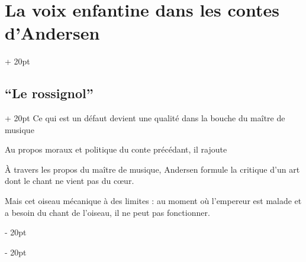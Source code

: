 \documentclass[a4paper, 12pt, twoside]{article}
\newcommand{\ind}[1][20pt]{\advance\leftskip + #1}
\newcommand{\deind}[1][20pt]{\advance\leftskip - #1}
\newenvironment{indt}[2][20pt]{#2 \par \ind[#1]}{\par \deind} %
\begin{document}
\begin{indt}{\section{La voix enfantine dans les contes d'Andersen}}
\begin{indt}{\subsection{``Le rossignol''}}
            Ce qui est un défaut devient une qualité dans la bouche du maître de musique
            
            Au propos moraux et politique du conte précédant, il rajoute 
            
            À travers les propos du maître de musique, Andersen formule la critique d'un art dont le chant ne vient pas du c\oe ur.
            
            Mais cet oiseau mécanique à des limites : au moment où l'empereur est malade et a besoin du chant de l'oiseau, il ne peut pas fonctionner.
            
        \end{indt}
    \end{indt}

    
    
    
\end{document}
